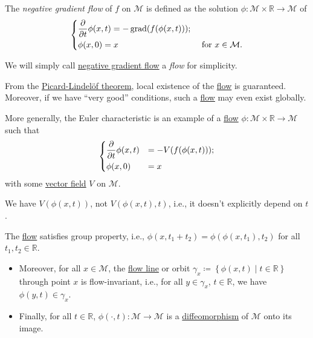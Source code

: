 \begin{definition}\label{def:negative-gradient-flow}
	The \emph{negative gradient flow} of \(f\) on \(\mathcal{M} \) is defined as the solution \(\phi \colon \mathcal{M} \times \mathbb{R} \to \mathcal{M}\) of
	\[
		\begin{dcases}
			\frac{\partial }{\partial t} \phi (x, t) = -\mathop{\mathrm{grad}}(f(\phi (x, t))) ; \\
			\phi (x, 0)                              = x & \text{ for }x\in \mathcal{M} .
		\end{dcases}
	\]
\end{definition}

\begin{note}
	We will simply call \hyperref[def:negative-gradient-flow]{negative gradient flow} a \emph{flow} for simplicity.
\end{note}

\begin{remark}
	From the \href{https://en.wikipedia.org/wiki/Picard-Lindelöf_theorem}{Picard-Lindelöf theorem}, local existence of the \hyperref[def:negative-gradient-flow]{flow} is guaranteed. Moreover, if we have ``very good'' conditions, such a \hyperref[def:negative-gradient-flow]{flow} may even exist globally.
\end{remark}

More generally, the Euler characteristic is an example of a \hyperref[def:negative-gradient-flow]{flow} \(\phi \colon \mathcal{M} \times \mathbb{R} \to \mathcal{M} \) such that
\[
	\begin{dcases}
		\frac{\partial }{\partial t} \phi (x, t) & = -V(f(\phi (x, t))) ; \\
		\phi (x, 0)                              & = x
	\end{dcases}
\]
with some \hyperref[def:vector-field]{vector field} \(V\) on \(\mathcal{M} \).

\begin{note}[Autonomous]
	We have \(V(\phi (x, t))\), not \(V(\phi (x, t), t)\), i.e., it doesn't explicitly depend on \(t\).
\end{note}

\begin{remark}
	The \hyperref[def:negative-gradient-flow]{flow} satisfies group property, i.e., \(\phi (x, t_1 + t_2) = \phi (\phi (x, t_1), t_2)\) for all \(t_1, t_2\in \mathbb{R} \).
	\begin{itemize}
		\item Moreover, for all \(x\in \mathcal{M} \), the \hyperref[def:negative-gradient-flow]{flow line} or orbit \(\gamma _x \coloneqq \left\{ \phi (x, t) \mid t\in \mathbb{R}  \right\}\) through point \(x\) is flow-invariant, i.e., for all \(y\in \gamma _x\), \(t\in \mathbb{R} \), we have \(\phi (y, t)\in \gamma _x\).
		\item Finally, for all \(t\in \mathbb{R} \), \(\phi (\cdot, t) \colon \mathcal{M} \to \mathcal{M} \) is a \hyperref[def:diffeomorphism]{diffeomorphism} of \(\mathcal{M} \) onto its image.
	\end{itemize}
\end{remark}

